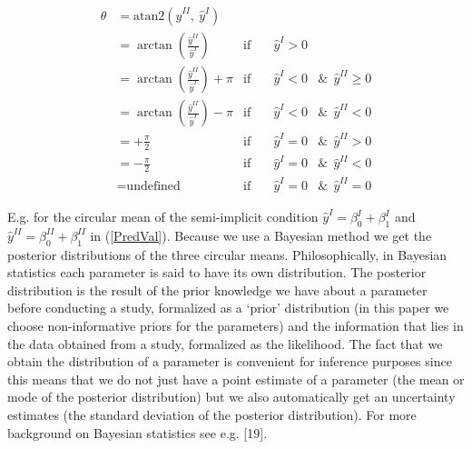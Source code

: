 \documentclass[11pt,]{article}
\begin{document}
\begin{align}\label{PredVal}
\theta          \nonumber                           &= \text{atan2}\left(\hat{y}^{II}, \: \hat{y}^{I}\right)  \\\nonumber
                                                                        &= \arctan\left(\frac{\hat{y}^{II}}{\hat{y}^{I}}\right) & \text{if}  \quad&\hat{y}^{I} > 0 \\\nonumber
                                                                        &= \arctan\left(\frac{\hat{y}^{II}}{\hat{y}^{I}}\right) + \pi & \text{if}  \quad& \hat{y}^{I}  <  0  & \&\:\: \hat{y}^{II} \geq 0\\\nonumber
                                                                        &= \arctan\left(\frac{\hat{y}^{II}}{\hat{y}^{I}}\right) - \pi & \text{if}  \quad&\hat{y}^{I}  <  0  & \&\:\:\hat{y}^{II}  < 0\\\nonumber
                                                                        &= +\frac{\pi}{2} & \text{if}  \quad& \hat{y}^{I}  =  0  & \&\:\:\hat{y}^{II} > 0\\\nonumber
                                                                        &= -\frac{\pi}{2} & \text{if}  \quad&\hat{y}^{I} =  0  & \&\:\:\hat{y}^{II} < 0\\
                                                                        &= \text{undefined} & \text{if} \quad& \hat{y}^{I} =  0  &  \&\:\:\hat{y}^{II} = 0 
\end{align}

E.g. for the circular mean of the semi-implicit condition
\(\hat{y}^{I} = \beta_0^{I} + \beta_1^{I}\) and
\(\hat{y}^{II} = \beta_0^{II} + \beta_1^{II}\) in (\ref{PredVal}).
Because we use a Bayesian method we get the posterior distributions of
the three circular means. Philosophically, in Bayesian statistics each
parameter is said to have its own distribution. The posterior
distribution is the result of the prior knowledge we have about a
parameter before conducting a study, formalized as a `prior'
distribution (in this paper we choose non-informative priors for the
parameters) and the information that lies in the data obtained from a
study, formalized as the likelihood. The fact that we obtain the
distribution of a parameter is convenient for inference purposes since
this means that we do not just have a point estimate of a parameter (the
mean or mode of the posterior distribution) but we also automatically
get an uncertainty estimates (the standard deviation of the posterior
distribution). For more background on Bayesian statistics see e.g.
{[}19{]}.
\end{document}
